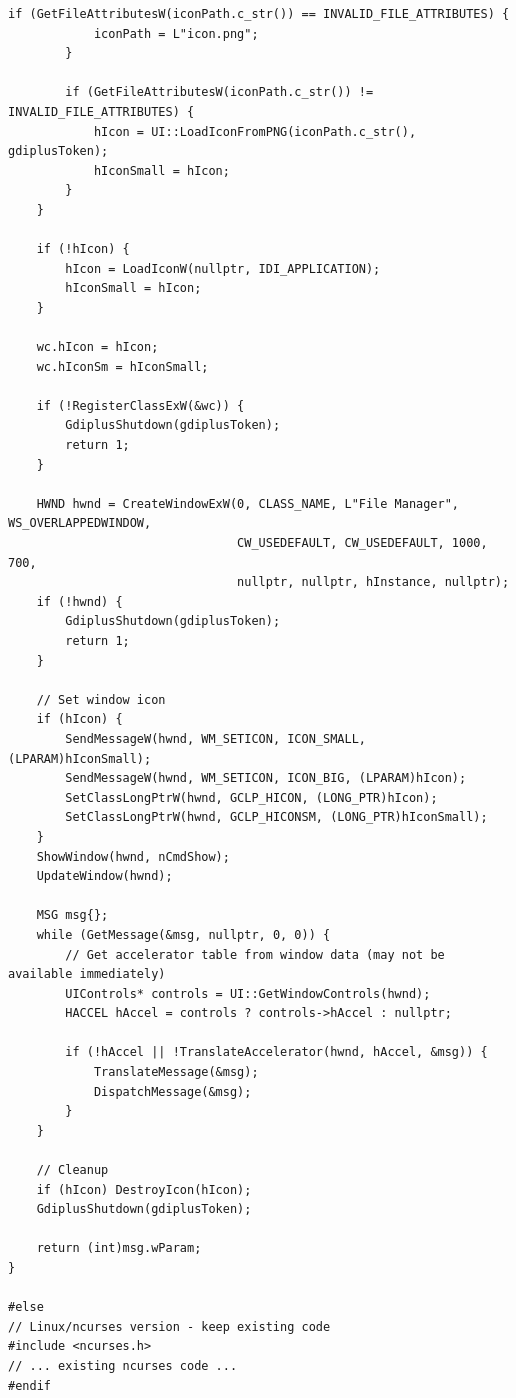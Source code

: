 \begin{lstlisting}[style=CodeListing]
        if (GetFileAttributesW(iconPath.c_str()) == INVALID_FILE_ATTRIBUTES) {
            iconPath = L"icon.png";
        }
        
        if (GetFileAttributesW(iconPath.c_str()) != INVALID_FILE_ATTRIBUTES) {
            hIcon = UI::LoadIconFromPNG(iconPath.c_str(), gdiplusToken);
            hIconSmall = hIcon;
        }
    }
    
    if (!hIcon) {
        hIcon = LoadIconW(nullptr, IDI_APPLICATION);
        hIconSmall = hIcon;
    }
    
    wc.hIcon = hIcon;
    wc.hIconSm = hIconSmall;
    
    if (!RegisterClassExW(&wc)) {
        GdiplusShutdown(gdiplusToken);
        return 1;
    }

    HWND hwnd = CreateWindowExW(0, CLASS_NAME, L"File Manager", WS_OVERLAPPEDWINDOW,
                                CW_USEDEFAULT, CW_USEDEFAULT, 1000, 700,
                                nullptr, nullptr, hInstance, nullptr);
    if (!hwnd) {
        GdiplusShutdown(gdiplusToken);
        return 1;
    }
    
    // Set window icon
    if (hIcon) {
        SendMessageW(hwnd, WM_SETICON, ICON_SMALL, (LPARAM)hIconSmall);
        SendMessageW(hwnd, WM_SETICON, ICON_BIG, (LPARAM)hIcon);
        SetClassLongPtrW(hwnd, GCLP_HICON, (LONG_PTR)hIcon);
        SetClassLongPtrW(hwnd, GCLP_HICONSM, (LONG_PTR)hIconSmall);
    }
    ShowWindow(hwnd, nCmdShow);
    UpdateWindow(hwnd);

    MSG msg{};
    while (GetMessage(&msg, nullptr, 0, 0)) {
        // Get accelerator table from window data (may not be available immediately)
        UIControls* controls = UI::GetWindowControls(hwnd);
        HACCEL hAccel = controls ? controls->hAccel : nullptr;
        
        if (!hAccel || !TranslateAccelerator(hwnd, hAccel, &msg)) {
            TranslateMessage(&msg);
            DispatchMessage(&msg);
        }
    }
    
    // Cleanup
    if (hIcon) DestroyIcon(hIcon);
    GdiplusShutdown(gdiplusToken);
    
    return (int)msg.wParam;
}

#else
// Linux/ncurses version - keep existing code
#include <ncurses.h>
// ... existing ncurses code ...
#endif
\end{lstlisting}
